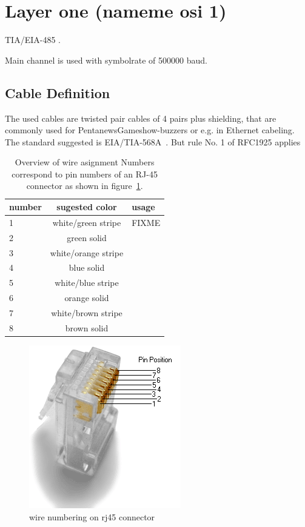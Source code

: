 \documentclass[a4paper,12pt]{scrartcl}
\begin{document}

\section{Layer one (nameme osi 1)}
TIA/EIA-485 \cite{EIA485}.

Main channel is used with symbolrate of 500000 baud. 



\subsection{Cable Definition}
The used cables are twisted pair cables of 4 pairs plus shielding, that are commonly used for  PentanewsGameshow-buzzers or e.g. in Ethernet cabeling.
The standard suggested is EIA/TIA-568A~\cite{EIA568}.
But rule No. 1 of RFC1925 \cite{RFC1925} applies

\begin{table}
	\centering
	\begin{tabular}{l c l}
		number        & sugested color      & usage \\
		\hline
		1             & white/green stripe  &   FIXME \\
		2             & green solid         &    \\
		3             & white/orange stripe &    \\
		4             & blue solid          &    \\
		5             & white/blue stripe   &    \\
		6             & orange solid        &    \\
		7             & white/brown stripe  &    \\
		8             & brown solid         &    \\
	\end{tabular}
	\caption{%
	Overview of wire asignment  \newline%
	Numbers correspond to pin numbers of an RJ-45 connector as shown in figure~\ref{fig:rj45}.
	}
	\label{tab:wires}
\end{table}

\begin{figure}
	\centering
	\includegraphics[scale=.7]{png/Rj45plug-8p8c.png}
	\caption{wire numbering on rj45 connector}
	\label{fig:rj45}
\end{figure}
\end{document}
